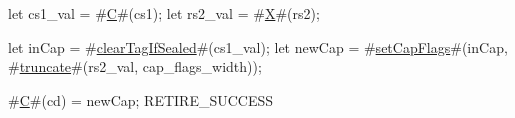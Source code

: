 let cs1_val = #\hyperref[sailRISCVzC]{C}#(cs1);
let rs2_val = #\hyperref[sailRISCVzX]{X}#(rs2);

let inCap = #\hyperref[sailRISCVzclearTagIfSealed]{clearTagIfSealed}#(cs1_val);
let newCap = #\hyperref[sailRISCVzsetCapFlags]{setCapFlags}#(inCap, #\hyperref[sailRISCVztruncate]{truncate}#(rs2_val, cap_flags_width));

#\hyperref[sailRISCVzC]{C}#(cd) = newCap;
RETIRE_SUCCESS

